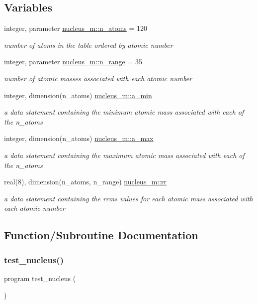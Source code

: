 \subsection*{Variables}
\begin{DoxyCompactItemize}
\item 
integer, parameter \mbox{\hyperlink{namespacenucleus__m_a97ff520812e294bf26a6b2c330f211e5}{nucleus\+\_\+m\+::n\+\_\+atoms}} = 120
\begin{DoxyCompactList}\small\item\em number of atoms in the table ordered by atomic number \end{DoxyCompactList}\item 
integer, parameter \mbox{\hyperlink{namespacenucleus__m_adf953c9196f6870fe5e502b4f40bea48}{nucleus\+\_\+m\+::n\+\_\+range}} = 35
\begin{DoxyCompactList}\small\item\em number of atomic masses associated with each atomic number \end{DoxyCompactList}\item 
integer, dimension(n\+\_\+atoms) \mbox{\hyperlink{namespacenucleus__m_a8541e730d34d4c5cbb0ca885c9c5cc35}{nucleus\+\_\+m\+::a\+\_\+min}}
\begin{DoxyCompactList}\small\item\em a data statement containing the minimum atomic mass associated with each of the n\+\_\+atoms \end{DoxyCompactList}\item 
integer, dimension(n\+\_\+atoms) \mbox{\hyperlink{namespacenucleus__m_ac8aa001386cf3938a2be5b5ec45d0c8d}{nucleus\+\_\+m\+::a\+\_\+max}}
\begin{DoxyCompactList}\small\item\em a data statement containing the maximum atomic mass associated with each of the n\+\_\+atoms \end{DoxyCompactList}\item 
real(8), dimension(n\+\_\+atoms, n\+\_\+range) \mbox{\hyperlink{namespacenucleus__m_aadb2a0e0828722e6e3f118cdf1b07f50}{nucleus\+\_\+m\+::rr}}
\begin{DoxyCompactList}\small\item\em a data statement containing the rrms values for each atomic mass associated with each atomic number \end{DoxyCompactList}\end{DoxyCompactItemize}


\subsection{Function/\+Subroutine Documentation}
\mbox{\label{table__mod_8f90_a8ebb53a70bcfe3c94dbfbae3e3f52cba}} 
\subsubsection{\texorpdfstring{test\_nucleus()}{test\_nucleus()}}
{\footnotesize\ttfamily program test\+\_\+nucleus (\begin{DoxyParamCaption}{ }\end{DoxyParamCaption})}

